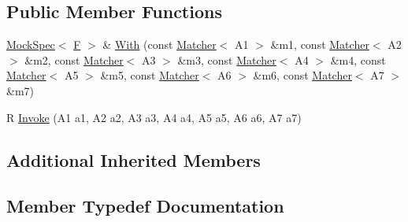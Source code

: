 \subsection*{Public Member Functions}
\begin{DoxyCompactItemize}
\item 
\hyperlink{classtesting_1_1internal_1_1_mock_spec}{Mock\+Spec}$<$ \hyperlink{classtesting_1_1internal_1_1_function_mocker_3_01_r_07_a1_00_01_a2_00_01_a3_00_01_a4_00_01_a5_00_01_a6_00_01_a7_08_4_a2ea0e33d9cc0d1f57d58b4aee98c117c}{F} $>$ \& \hyperlink{classtesting_1_1internal_1_1_function_mocker_3_01_r_07_a1_00_01_a2_00_01_a3_00_01_a4_00_01_a5_00_01_a6_00_01_a7_08_4_abaa600e7ae355a1579d1c02a4ea726fb}{With} (const \hyperlink{classtesting_1_1_matcher}{Matcher}$<$ A1 $>$ \&m1, const \hyperlink{classtesting_1_1_matcher}{Matcher}$<$ A2 $>$ \&m2, const \hyperlink{classtesting_1_1_matcher}{Matcher}$<$ A3 $>$ \&m3, const \hyperlink{classtesting_1_1_matcher}{Matcher}$<$ A4 $>$ \&m4, const \hyperlink{classtesting_1_1_matcher}{Matcher}$<$ A5 $>$ \&m5, const \hyperlink{classtesting_1_1_matcher}{Matcher}$<$ A6 $>$ \&m6, const \hyperlink{classtesting_1_1_matcher}{Matcher}$<$ A7 $>$ \&m7)
\item 
R \hyperlink{classtesting_1_1internal_1_1_function_mocker_3_01_r_07_a1_00_01_a2_00_01_a3_00_01_a4_00_01_a5_00_01_a6_00_01_a7_08_4_a9088342f6d93448dba290e565c006979}{Invoke} (A1 a1, A2 a2, A3 a3, A4 a4, A5 a5, A6 a6, A7 a7)
\end{DoxyCompactItemize}
\subsection*{Additional Inherited Members}


\subsection{Member Typedef Documentation}
\mbox{\label{classtesting_1_1internal_1_1_function_mocker_3_01_r_07_a1_00_01_a2_00_01_a3_00_01_a4_00_01_a5_00_01_a6_00_01_a7_08_4_a313911b9c80b57c8c25f0ad5ef2d0bdc}} 
